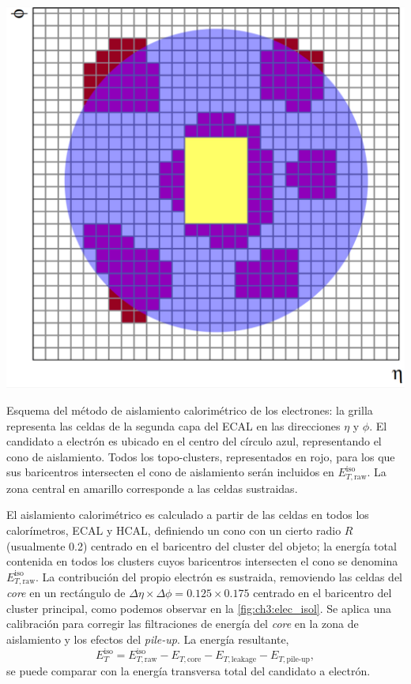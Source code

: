 \begin{marginfigure}
    \includegraphics[width=\linewidth]{Assets/Images/electron_isol.pdf}
    \caption{Esquema del método de aislamiento calorimétrico de los electrones: la grilla representa las celdas de la segunda capa del ECAL en las direcciones $\eta$ y $\phi$. El candidato a electrón es ubicado en el centro del círculo azul, representando el cono de aislamiento. Todos los topo-clusters, representados en rojo, para los que sus baricentros intersecten el cono de aislamiento serán incluidos en $E_{T,\text{raw}}^{\text{iso}}$. La zona central en amarillo corresponde a las celdas sustraidas.}
    \label{fig:ch3:elec_isol}
\end{marginfigure}

El aislamiento calorimétrico es calculado a partir de las celdas en todos los calorímetros, ECAL y HCAL, definiendo un cono con un cierto radio $R$ (usualmente 0.2) centrado en el baricentro del cluster del objeto; la energía total contenida en todos los clusters cuyos baricentros intersecten el cono se denomina $E_{T,\text{raw}}^{\text{iso}}$. La contribución del propio electrón es sustraida, removiendo las celdas del \textit{core} en un rectángulo de $\Delta\eta \times \Delta\phi = 0.125 \times 0.175$ centrado en el baricentro del cluster principal, como podemos observar en la \cref{fig:ch3:elec_isol}. Se aplica una calibración para corregir las filtraciones de energía del \textit{core} en la zona de aislamiento y los efectos del \textit{pile-up}. La energía resultante,
\[ E_T^{\text{iso}} = E_{T,\text{raw}}^{\text{iso}} - E_{T,\text{core}} - E_{T,\text{leakage}} - E_{T,\text{pile-up}}, \]
se puede comparar con la energía transversa total del candidato a electrón.

